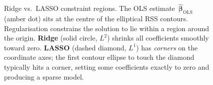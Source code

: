 \begin{figure}[ht]
\caption{Ridge vs.\ LASSO constraint regions.  The OLS
estimate~$\hat{\bm{\beta}}_{\mathrm{OLS}}$ (amber dot) sits at the
centre of the elliptical RSS contours.  Regularisation constrains the
solution to lie within a region around the origin.  \textbf{Ridge}
(solid circle, $L^2$) shrinks all coefficients smoothly toward zero.
\textbf{LASSO} (dashed diamond, $L^1$) has \emph{corners} on the
coordinate axes; the first contour ellipse to touch the diamond
typically hits a corner, setting some coefficients exactly to zero
and producing a sparse model.}
\label{fig:ridge-lasso}
\end{figure}



